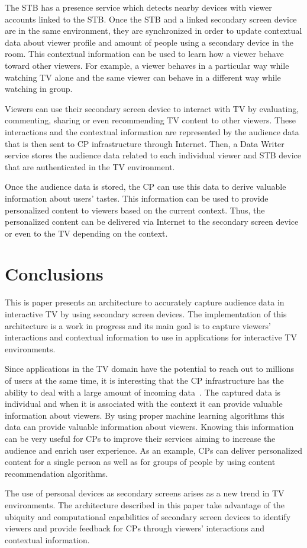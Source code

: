 \documentclass[conference,a4paper]{IEEEtran}
\begin{document}
The STB has a presence service which detects nearby devices with viewer accounts linked to the STB. Once the STB and a linked secondary screen device are in the same environment, they are synchronized in order to update contextual data about viewer profile and amount of people using a secondary device in the room. This contextual information can be used to learn how a viewer behave toward other viewers. For example, a viewer behaves in a particular way while watching TV alone and the same viewer can behave in a different way while watching in group.

Viewers can use their secondary screen device to interact with TV by evaluating, commenting, sharing or even recommending TV content to other viewers. These interactions and the contextual information are represented by the audience data that is then sent to CP infrastructure through Internet. Then, a Data Writer service stores the audience data related to each individual viewer and STB device that are authenticated in the TV environment.

Once the audience data is stored, the CP can use this data to derive valuable information about users' tastes. This information can be used to provide personalized content to viewers based on the current context. Thus, the personalized content can be delivered via Internet to the secondary screen device or even to the TV depending on the context.

\section{Conclusions}

This is paper presents an architecture to accurately capture audience data in interactive TV by using secondary screen devices. The implementation of this architecture is a work in progress and its main goal is to capture viewers' interactions and contextual information to use in applications for interactive TV environments.

Since applications in the TV domain have the potential to reach out to millions of users at the same time, it is interesting that the CP infrastructure has the ability to deal with a large amount of incoming data~\cite{Lee2010}. The captured data is individual and when it is associated with the context it can provide valuable information about viewers. By using proper machine learning algorithms this data can provide valuable information about viewers. Knowing this information can be very useful for CPs to improve their services aiming to increase the audience and enrich user experience. As an example, CPs can deliver personalized content for a single person as well as for groups of people by using content recommendation algorithms.

The use of personal devices as secondary screens arises as a new trend in TV environments. The architecture described in this paper take advantage of the ubiquity and computational capabilities of secondary screen devices to identify viewers and provide feedback for CPs through viewers' interactions and contextual information. 



\end{document}
